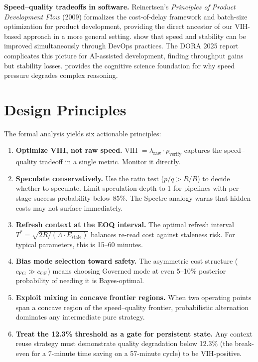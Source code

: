 \documentclass[11pt, a4paper, copyright]{googledeepmind}
\begin{document}
\textbf{Speed--quality tradeoffs in software.} Reinertsen's \emph{Principles of Product Development Flow} (2009) formalizes the cost-of-delay framework and batch-size optimization for product development, providing the direct ancestor of our VIH-based approach in a more general setting. \citet{forsgren2018accelerate} show that speed and stability can be improved simultaneously through DevOps practices. The DORA 2025 report \citep{dora2025} complicates this picture for AI-assisted development, finding throughput gains but stability losses. \citet{kahneman2011thinking} provides the cognitive science foundation for why speed pressure degrades complex reasoning.


\section{Design Principles}\label{sec:principles}

The formal analysis yields six actionable principles:

\begin{enumerate}
    \item \textbf{Optimize VIH, not raw speed.} VIH $= \lambda_{\mathrm{raw}} \cdot p_{\mathrm{verify}}$ captures the speed--quality tradeoff in a single metric. Monitor it directly.

    \item \textbf{Speculate conservatively.} Use the ratio test ($p/q > R/B$) to decide whether to speculate. Limit speculation depth to 1 for pipelines with per-stage success probability below 85\%. The Spectre analogy warns that hidden costs may not surface immediately.

    \item \textbf{Refresh context at the EOQ interval.} The optimal refresh interval $T^* = \sqrt{2R/(\Lambda \cdot E_{\mathrm{stale}})}$ balances re-read cost against staleness risk. For typical parameters, this is 15--60 minutes.

    \item \textbf{Bias mode selection toward safety.} The asymmetric cost structure ($c_{\mathrm{FG}} \gg c_{\mathrm{GF}}$) means choosing Governed mode at even 5--10\% posterior probability of needing it is Bayes-optimal.

    \item \textbf{Exploit mixing in concave frontier regions.} When two operating points span a concave region of the speed--quality frontier, probabilistic alternation dominates any intermediate pure strategy.

    \item \textbf{Treat the 12.3\% threshold as a gate for persistent state.} Any context reuse strategy must demonstrate quality degradation below 12.3\% (the break-even for a 7-minute time saving on a 57-minute cycle) to be VIH-positive.
\end{enumerate}
\end{document}
